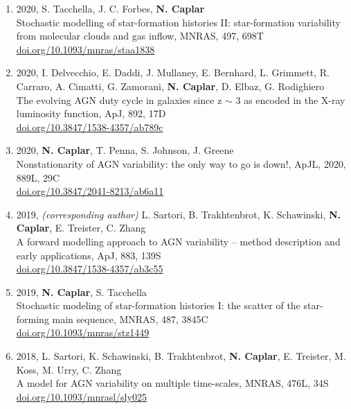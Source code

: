 \documentclass[11pt,letterpaper]{article}
\begin{document}
\begin{enumerate}
\item 2020,  S. Tacchella, J. C. Forbes, \textbf{N. Caplar}\\
Stochastic modelling of star-formation histories II: star-formation variability from molecular clouds and gas inflow,  MNRAS, 497, 698T\\
\href{https://doi.org/10.1093/mnras/staa1838}{doi.org/10.1093/mnras/staa1838} \\

\item 2020,  I. Delvecchio, E. Daddi, J. Mullaney, E. Bernhard, L. Grimmett, R. Carraro, A. Cimatti, G. Zamorani,  \textbf{N. Caplar}, D. Elbaz, G. Rodighiero \\
The evolving AGN duty cycle in galaxies since z $\sim$ 3 as encoded in the X-ray luminosity function, ApJ, 892, 17D\\
\href{https://doi.org/10.3847/1538-4357/ab789c}{doi.org/10.3847/1538-4357/ab789c} \\

\item 2020, \textbf{N. Caplar}, T. Penna, S. Johnson, J. Greene \\
Nonstationarity of AGN variability: the only way to go is down!, ApJL, 2020, 889L, 29C\\
\href{https://doi.org/10.3847/2041-8213/ab6a11}{doi.org/10.3847/2041-8213/ab6a11} \\

\item 2019, \textit{(corresponding author)} L. Sartori, B. Trakhtenbrot, K. Schawinski, \textbf{N. Caplar}, E. Treister, C. Zhang\\
A forward modelling approach to AGN variability -- method
description and early applications, ApJ, 883, 139S\\
\href{https://doi.org/10.3847/1538-4357/ab3c55}{doi.org/10.3847/1538-4357/ab3c55} \\

\item 2019, \textbf{N. Caplar}, S. Tacchella \\
Stochastic modeling of star-formation histories I: the scatter of the star-forming main sequence, MNRAS, 487, 3845C\\
\href{https://doi.org/10.1093/mnras/stz1449}{doi.org/10.1093/mnras/stz1449} \\

\item 2018, L. Sartori, K. Schawinski, B. Trakhtenbrot, \textbf{N. Caplar}, E. Treister, M. Koss, M. Urry, C. Zhang \\
A model for AGN variability on multiple time-scales, MNRAS, 476L, 34S\\
\href{https://doi.org/10.1093/mnrasl/sly025}{doi.org/10.1093/mnrasl/sly025} \\ 


\end{enumerate}
\end{document}
